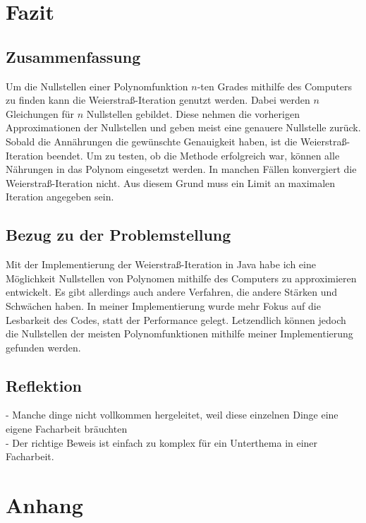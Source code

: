 \documentclass[12pt]{article}
\begin{document}
\section{Fazit}
\subsection{Zusammenfassung}
Um die Nullstellen einer Polynomfunktion $n$-ten Grades mithilfe des Computers zu finden kann die Weierstraß-Iteration genutzt werden. Dabei werden $n$ Gleichungen für $n$ Nullstellen gebildet. Diese nehmen die vorherigen Approximationen der Nullstellen und geben meist eine genauere Nullstelle zurück. Sobald die Annährungen die gewünschte Genauigkeit haben, ist die Weierstraß-Iteration beendet. Um zu testen, ob die Methode erfolgreich war, können alle Nährungen in das Polynom eingesetzt werden. In manchen Fällen konvergiert die Weierstraß-Iteration nicht. Aus diesem Grund muss ein Limit an maximalen Iteration angegeben sein.

\subsection{Bezug zu der Problemstellung}
Mit der Implementierung der Weierstraß-Iteration in Java habe ich eine Möglichkeit Nullstellen von Polynomen mithilfe des Computers zu approximieren entwickelt. Es gibt allerdings auch andere Verfahren, die andere Stärken und Schwächen haben. In meiner Implementierung wurde mehr Fokus auf die Lesbarkeit des Codes, statt der Performance gelegt. Letzendlich können jedoch die Nullstellen der meisten Polynomfunktionen mithilfe meiner Implementierung gefunden werden.

\subsection{Reflektion}
- Manche dinge nicht vollkommen hergeleitet, weil diese einzelnen Dinge eine eigene Facharbeit bräuchten\\
- Der richtige Beweis ist einfach zu komplex für ein Unterthema in einer Facharbeit.


\section{Anhang}
\end{document}
